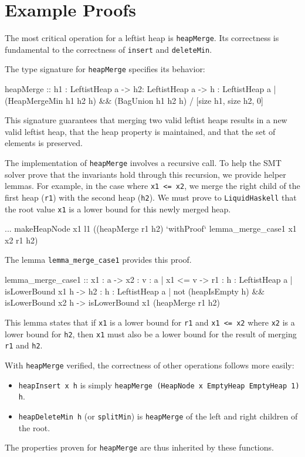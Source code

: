 \section{Example Proofs}
The most critical operation for a leftist heap is \texttt{heapMerge}. Its correctness is fundamental to the correctness of \texttt{insert} and \texttt{deleteMin}.

The type signature for \texttt{heapMerge} specifies its behavior:
\begin{code}
  heapMerge :: h1 : LeftistHeap a 
        -> h2: LeftistHeap a 
        -> {h : LeftistHeap a | (HeapMergeMin h1 h2 h) 
                             && (BagUnion h1 h2 h)}
        / [size h1, size h2, 0]
\end{code}
This signature guarantees that merging two valid leftist heaps results in a new valid leftist heap, that the heap property is maintained, and that the set of elements is preserved.

The implementation of \texttt{heapMerge} involves a recursive call. To help the SMT solver prove that the invariants hold through this recursion, we provide helper lemmas. For example, in the case where \texttt{x1 <= x2}, we merge the right child of the first heap (\texttt{r1}) with the second heap (\texttt{h2}). We must prove to \texttt{LiquidHaskell} that the root value \texttt{x1} is a lower bound for this newly merged heap.
\begin{code}
... makeHeapNode x1 l1 ((heapMerge r1 h2) 
    `withProof` lemma_merge_case1 x1 x2 r1 h2)
\end{code}
The lemma \texttt{lemma\_merge\_case1} provides this proof.
\begin{code}
  lemma_merge_case1 :: x1 : a  
        -> x2 : { v : a |  x1  <= v}
        -> r1 : {h : LeftistHeap a | isLowerBound x1 h} 
        -> h2 : {h : LeftistHeap a | not (heapIsEmpty h) 
                                  && isLowerBound x2 h}  
        -> {isLowerBound x1 (heapMerge r1 h2)}
\end{code}
This lemma states that if \texttt{x1} is a lower bound for \texttt{r1} and \texttt{x1 <= x2} where \texttt{x2} is a lower bound for \texttt{h2}, then \texttt{x1} must also be a lower bound for the result of merging \texttt{r1} and \texttt{h2}.

With \texttt{heapMerge} verified, the correctness of other operations follows more easily:
\begin{itemize}
	\item \texttt{heapInsert x h} is simply \texttt{heapMerge (HeapNode x EmptyHeap EmptyHeap 1) h}.
	\item \texttt{heapDeleteMin h} (or \texttt{splitMin}) is \texttt{heapMerge} of the left and right children of the root.
\end{itemize}
The properties proven for \texttt{heapMerge} are thus inherited by these functions.

